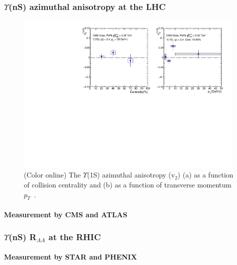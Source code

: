 \subsubsection{$\Upsilon$(nS) azimuthal anisotropy at the LHC}

\begin{figure}
\includegraphics[width=0.99\textwidth]{Figures/ExpOverview/Fig_CMS_Y1S_5TeV_V2.pdf}
\caption{(Color online) The $\Upsilon$(1S) azimuthal anisotropy (v$_{2}$) (a) as a function of collision centrality and 
  (b) as a function of transverse momentum $p_{T}$~\cite{CMS:2020efs}.
}
\label{fig:Upsilon1SV2CMS}
\end{figure}







\paragraph{Measurement by CMS and ATLAS}

\subsubsection{$\Upsilon$(nS) R$_{AA}$ at the RHIC}

\paragraph{Measurement by STAR and PHENIX}
